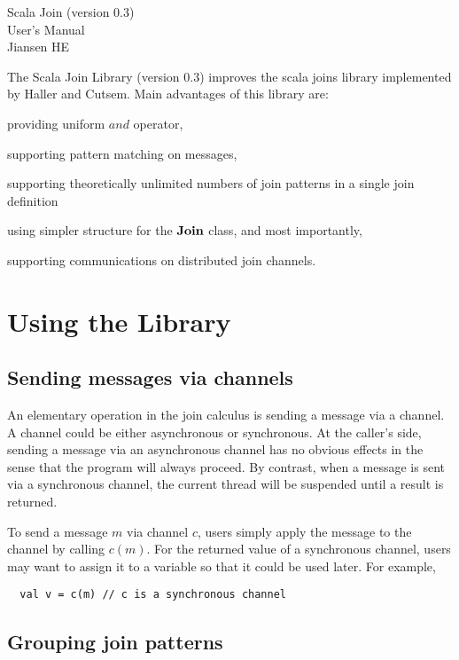 \begin{center}
\LARGE{Scala Join (version 0.3) \\User's Manual}\\

\vspace{10 mm} \large{Jiansen HE}
\end{center}

The Scala Join Library (version 0.3) improves the scala joins library \cite{scala_joins} implemented by Haller and Cutsem.  Main advantages of this library are: 
\begin{inparaenum}[(i)]
  \item providing uniform $and$ operator,
  \item supporting pattern matching on messages,
  \item supporting theoretically unlimited numbers of join patterns in a single join definition
  \item using simpler structure for the $\bf{Join}$ class, and most importantly,
  \item supporting communications on distributed join channels.
\end{inparaenum}  

\section{Using the Library}
\subsection{Sending messages via channels}
An elementary operation in the join calculus is sending a message via a channel.  A channel could be either asynchronous or synchronous.  At the caller's side, sending a message via an asynchronous channel has no obvious effects in the sense that the program will always proceed.  By contrast, when a message is sent via a synchronous channel, the current thread will be suspended until a result is returned.  

To send a message $m$ via channel $c$, users simply apply the message to the channel by calling $c(m)$.  For the returned value of a synchronous channel, users may want to assign it to a variable so that it could be used later.  For example,
\begin{lstlisting}
  val v = c(m) // c is a synchronous channel
\end{lstlisting}

\subsection{Grouping join patterns}

